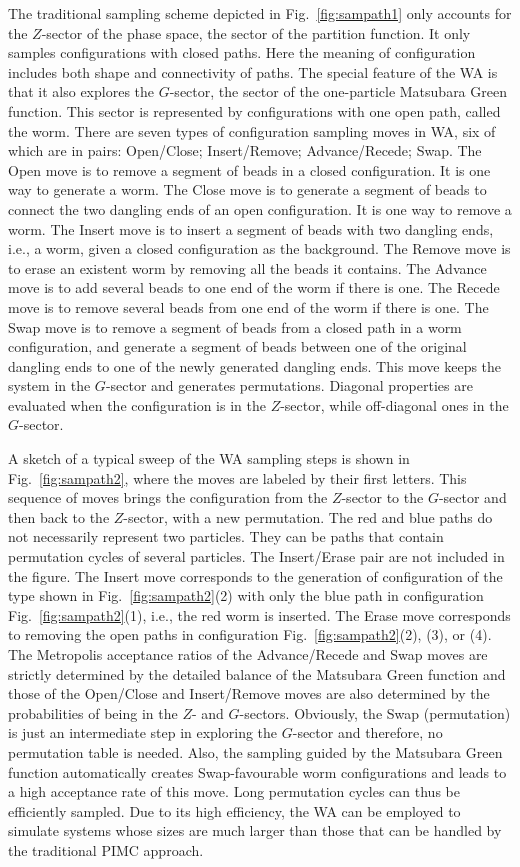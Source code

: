 \documentclass[12pt]{iopart}
\begin{document}
The traditional sampling scheme depicted in Fig.~\ref{fig:sampath1} only accounts for the $Z$-sector of the phase space, the sector of the partition function. It only samples configurations with closed paths. Here the meaning of configuration includes both shape and connectivity of paths. The special feature of the WA is that it also explores the $G$-sector, the sector of the one-particle Matsubara Green function. This sector is represented by configurations with one open path, called the worm. There are seven types of configuration sampling moves in WA, six of which are in pairs: Open/Close; Insert/Remove; Advance/Recede; Swap. The Open move is to remove a segment of beads in a closed configuration.
It is one way to generate a worm. 
The Close move is to generate a segment of beads to connect the two dangling ends of an open configuration. 
It is one way to remove a worm. 
The Insert move is to insert a segment of beads with two dangling ends, i.e., a worm, given a closed configuration as the background. 
The Remove move is to erase an existent worm by removing all the beads it contains. 
The Advance move is to add several beads to one end of the worm if there is one. 
The Recede move is to remove several beads from one end of the worm if there is one. 
The Swap move is to remove a segment of beads from a closed path in a worm configuration, 
and generate a segment of beads between one of the original dangling ends to one of the newly generated dangling ends. 
This move keeps the system in the $G$-sector and generates permutations. 
Diagonal properties are evaluated when the configuration is in the $Z$-sector, while off-diagonal ones in the $G$-sector.

A sketch of a typical sweep of the WA sampling steps is shown in Fig.~\ref{fig:sampath2}, 
where the moves are labeled by their first letters. 
This sequence of moves brings the configuration from the $Z$-sector to the $G$-sector and then back to the $Z$-sector, with a new permutation. 
The red and blue paths do not necessarily represent two particles. They can be paths that contain permutation cycles of several particles. 
The Insert/Erase pair are not included in the figure. 
The Insert move corresponds to the generation of configuration of the type shown in Fig.~\ref{fig:sampath2}(2) with only the blue path in configuration Fig.~\ref{fig:sampath2}(1), i.e., the red worm is inserted. 
The Erase move corresponds to removing the open paths in configuration Fig.~\ref{fig:sampath2}(2), (3), or (4). 
The Metropolis acceptance ratios of the Advance/Recede and Swap moves are strictly determined by the detailed balance of the Matsubara Green function and those of the Open/Close and Insert/Remove moves are also determined by the probabilities of being in the $Z$- and $G$-sectors. 
Obviously, the Swap (permutation) is just an intermediate step in exploring the $G$-sector and therefore, no permutation table is needed. 
Also, the sampling guided by the Matsubara Green function automatically creates Swap-favourable worm configurations and leads to a high acceptance rate of this move. 
Long permutation cycles can thus be efficiently sampled. 
Due to its high efficiency, the WA can be employed to simulate systems whose sizes are much larger than those that can be handled by the traditional PIMC approach.
\end{document}
